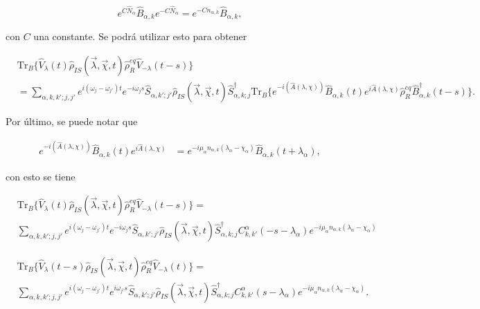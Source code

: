 \begin{appendixs}
\begin{equation*}
    e^{C\hat{N}_{\alpha}}\hat{B}_{\alpha,k}e^{-C\hat{N}_{\alpha}} = e^{-Cn_{\alpha,k}}\hat{B}_{\alpha,k},
\end{equation*}

con $C$ una constante. Se podrá utilizar esto para obtener

\begin{align*}
   & \text{Tr}_{B}\{ \hat{V}_{\lambda}(t)\hat{\rho}_{IS}(\vec{\lambda},\vec{\chi},t)\hat{\rho}_{R}^{eq}\hat{V}_{-\lambda}(t-s) \} \\
   & = \sum_{\alpha,k,k';j,j'}e^{i(\omega_{j}-\omega_{j'})t}e^{-i\omega_{j}s}\hat{S}_{\alpha,k';j'}\hat{\rho}_{IS}(\vec{\lambda},\vec{\chi},t)\hat{S}^{\dagger}_{\alpha,k;j} \text{Tr}_{B}\{e^{-i(\hat{A}(\lambda,\chi))} \hat{B}_{\alpha,k}(t)e^{i\hat{A}(\lambda,\chi)}\hat{\rho}_{R}^{eq}\hat{B}^{\dagger}_{\alpha,k}(t-s) \}.
\end{align*}

Por último, se puede notar que 

\begin{align*}
    e^{-i(\hat{A}(\lambda,\chi))} \hat{B}_{\alpha,k}(t)e^{i\hat{A}(\lambda,\chi)} & = e^{-i\mu_{\alpha}n_{\alpha,k}(\lambda_{\alpha}-\chi_{\alpha})} \hat{B}_{\alpha,k}(t+\lambda_{\alpha}), 
\end{align*}

con esto se tiene

\begin{align*}
 & \text{Tr}_{B}\{ \hat{V}_{\lambda}(t)\hat{\rho}_{IS}(\vec{\lambda},\vec{\chi},t)\hat{\rho}_{R}^{eq}\hat{V}_{-\lambda}(t-s) \} = \\
 & \sum_{\alpha,k,k';j,j'}e^{i(\omega_{j}-\omega_{j'})t}e^{-i\omega_{j}s}\hat{S}_{\alpha,k';j'}\hat{\rho}_{IS}(\vec{\lambda},\vec{\chi},t)\hat{S}^{\dagger}_{\alpha,k;j} C^{\alpha}_{k,k'}(-s-\lambda_{\alpha})e^{-i\mu_{\alpha}n_{\alpha,k}(\lambda_{\alpha}-\chi_{\alpha})}
 \end{align*}

 \begin{align*}
    & \text{Tr}_{B}\{ \hat{V}_{\lambda}(t-s)\hat{\rho}_{IS}(\vec{\lambda},\vec{\chi},t)\hat{\rho}_{R}^{eq}\hat{V}_{-\lambda}(t) \} = \\
    & \sum_{\alpha,k,k';j,j'}e^{i(\omega_{j}-\omega_{j'})t}e^{i\omega_{j'}s}\hat{S}_{\alpha,k';j'}\hat{\rho}_{IS}(\vec{\lambda},\vec{\chi},t)\hat{S}^{\dagger}_{\alpha,k;j} C^{\alpha}_{k,k'}(s-\lambda_{\alpha})e^{-i\mu_{\alpha}n_{\alpha,k}(\lambda_{\alpha}-\chi_{\alpha})}.
    \end{align*}
   

\end{appendixs}

